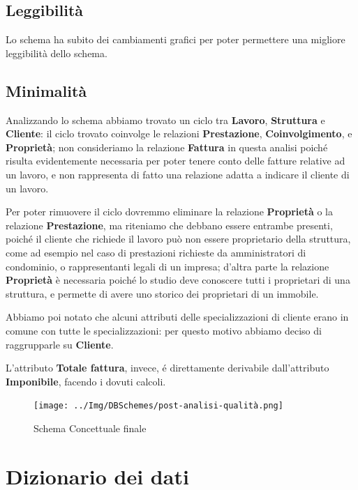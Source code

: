 \documentclass{elegantbook}
\begin{document}
        \subsection{Leggibilità}
        Lo schema ha subito dei cambiamenti grafici per poter permettere una migliore leggibilità dello schema.
        \subsection{Minimalità}
        Analizzando lo schema abbiamo trovato un ciclo tra \textbf{Lavoro}, \textbf{Struttura} e \textbf{Cliente}: il ciclo
        trovato coinvolge le relazioni \textbf{Prestazione}, \textbf{Coinvolgimento}, e \textbf{Proprietà}; non consideriamo la
        relazione \textbf{Fattura} in questa analisi poiché risulta evidentemente necessaria per poter tenere conto delle fatture
        relative ad un lavoro, e non rappresenta di fatto una relazione adatta a indicare il cliente di un lavoro.
        
        Per poter rimuovere il ciclo dovremmo eliminare la relazione \textbf{Proprietà} o la relazione \textbf{Prestazione}, ma riteniamo
        che debbano essere entrambe presenti, poiché il cliente che richiede il lavoro può non essere proprietario della struttura, come
        ad esempio nel caso di prestazioni richieste da amministratori di condominio, o rappresentanti legali di un impresa; d'altra parte
        la relazione \textbf{Proprietà} è necessaria poiché lo studio deve conoscere tutti i proprietari di una struttura, e permette di
        avere uno storico dei proprietari di un immobile.

        Abbiamo poi notato che alcuni attributi delle specializzazioni di cliente erano in comune con tutte le specializzazioni:
        per questo motivo abbiamo deciso di raggrupparle su \textbf{Cliente}.

        L'attributo \textbf{Totale fattura}, invece, é direttamente derivabile dall'attributo \textbf{Imponibile}, facendo i dovuti calcoli.
        \begin{figure}
            \texttt{[image: ../Img/DBSchemes/post-analisi-qualità.png]} 
            \caption{Schema Concettuale finale}
        \end{figure}
        \newpage
	\section{Dizionario dei dati}
\end{document}
